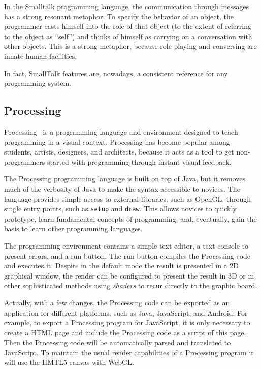 In the Smalltalk programming language, the communication through messages has a strong resonant metaphor. To specify the behavior of an object, the programmer casts himself into the role of that object (to the extent of referring to the object as ``self'') and thinks of himself as carrying on a conversation with other objects. This is a strong metaphor, because role-playing and conversing are innate human facilities. 

In fact, SmallTalk features are, nowadays, a consistent reference for any programming system.
\subsection{Processing}
\label{subsec:processing}
Processing~\cite{Reas2006} is a programming language and environment designed to teach programming in a visual context. Processing has become popular among students, artists, designers, and architects, because it acts as a tool to get non-programmers started with programming through instant visual feedback.

The Processing programming language is built on top of Java, but it removes much of the verbosity of Java to make the syntax accessible to novices. The language provides simple access to external libraries, such as OpenGL, through single entry points, such as \texttt{setup} and \texttt{draw}. This allows novices to quickly prototype, learn fundamental concepts of programming, and, eventually, gain the basis to learn other programming languages.

The programming environment contains a simple text editor, a text console to present errors, and a run button. The run button compiles the Processing code and executes it. Despite in the default mode the result is presented in a 2D graphical window, the render can be configured to present the result in 3D or in other sophisticated methods using \textit{shaders} to recur directly to the graphic board.

Actually, with a few changes, the Processing code can be exported as an application for different platforms, such as Java, JavaScript, and Android. For example, to export a Processing program for JavaScript, it is only necessary to create a HTML page and include the Processing code as a script of this page. Then the Processing code will be automatically parsed and translated to JavaScript. To maintain the usual render capabilities of a Processing program it will use the HMTL5 canvas with WebGL.

